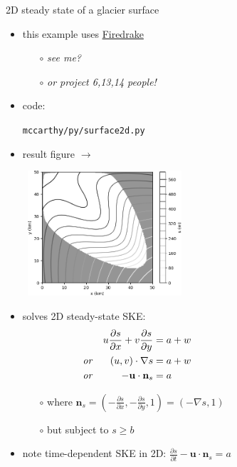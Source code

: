 \documentclass[10pt,dvipsnames]{beamer}
\newcommand{\bn}{\mathbf{n}}
\newcommand{\bu}{\mathbf{u}}
\newcommand{\grad}{\nabla}
\begin{document}
\begin{frame}{2D steady state of a glacier surface}

\begin{itemize}
\item this example uses \href{https://www.firedrakeproject.org/}{Firedrake}
{\footnotesize
    \begin{itemize}
    \item[$\circ$] \emph{see me?}
    \item[$\circ$] \emph{or project 6,13,14 people!}
    \end{itemize}
}
\item code:

\texttt{mccarthy/py/surface2d.py}

\item result figure $\rightarrow$

\vspace{-25mm}
\mbox{\hspace{60mm} \includegraphics[width=0.45\textwidth]{surface2d}}

\vspace{-12mm}
\item solves 2D steady-state SKE:
\begin{align*}
&& u \frac{\partial s}{\partial x} + v \frac{\partial s}{\partial y} &= a + w \hspace{40mm}\\
\text{\emph{or}} && (u,v) \cdot \grad s &= a + w \\
\text{\emph{or}} && -\bu \cdot \bn_s &= a
\end{align*}

{\footnotesize
    \begin{itemize}
    \item[$\circ$] where $\bn_s = (-\frac{\partial s}{\partial x},-\frac{\partial s}{\partial y},1) = (-\grad s,1)$
    \item[$\circ$] \alert{but subject to $s \ge b$}
    \end{itemize}
}

\medskip
\item note time-dependent SKE in 2D: \quad $\displaystyle \frac{\partial s}{\partial t} - \bu \cdot \bn_s = a$
\end{itemize}
\end{frame}
\end{document}
